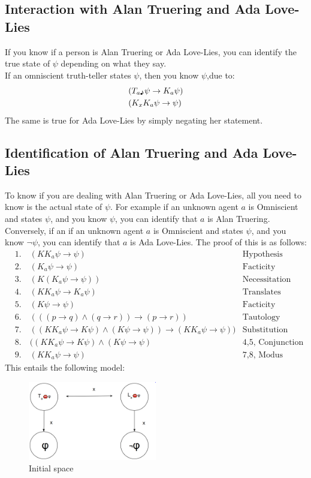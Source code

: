 \documentclass[12pt, titlepage, twoside]{report}
\begin{document}
\subsection{Interaction with Alan Truering and Ada Love-Lies}
If you know if a person is Alan Truering or Ada Love-Lies, you can identify the true state of $\psi$ depending on what they say.\\
If an omniscient truth-teller states $\psi$, then you know $\psi$,due to:
\begin{align*}
&(T_{a \text{\textmusicalnote}}\psi \to K_a \psi)\\
&(K_x K_a \psi \to \psi)
\end{align*}
The same is true for Ada Love-Lies by simply negating her statement.

\subsection{Identification of Alan Truering and Ada Love-Lies}
To know if you are dealing with Alan Truering or Ada Love-Lies, all you need to know is the actual state of $\psi$. For example if an unknown agent $a$ is Omniscient and states $\psi$, and you know $\psi$, you can identify that $a$ is Alan Truering. Conversely, if an if an unknown agent $a$ is Omniscient and states $\psi$, and you know $\neg \psi$, you can identify that $a$ is Ada Love-Lies. The proof of this is as follows:
\begin{align*}
&1. \quad (KK_a \psi \to \psi) \quad \quad &\text{Hypothesis}\\
&2. \quad (K_a \psi \to \psi) &\text{Facticity}\\
&3. \quad (K(K_a \psi \to \psi)) &\text{Necessitation}\\
&4. \quad (KK_a \psi \to K_a \psi) &\text{Translates across implication}\\
&5. \quad (K \psi \to \psi) &\text{Facticity}\\
&6. \quad (((p \to q) \wedge (q \to r)) \to (p \to r)) &\text{Tautology}\\
&7. \quad ((KK_a \psi \to K \psi) \wedge (K \psi \to \psi)) \to (KK_a \psi \to \psi)) &\text{Substitution}\\
&8. \quad ((KK_a \psi \to K \psi) \wedge (K \psi \to \psi) &\text{4,5, Conjunction}\\
&9. \quad (KK_a \psi \to \psi) &\text{7,8, Modus Ponens}
\end{align*}
This entails the following model:\\
\begin{figure}[h]
  \centering
  \includegraphics[width=0.5\textwidth]{slide10.eps}
  \caption{Initial space}
\end{figure}\\
\end{document}
